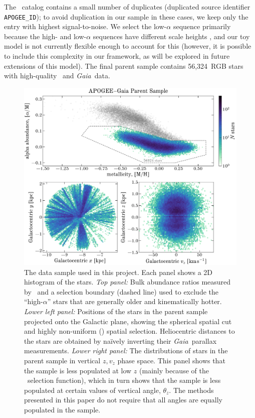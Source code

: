\documentclass[modern]{aastex63}
\newcommand{\gaia}{\textsl{Gaia}}
\newcommand{\apogee}{\acronym{APOGEE}}
\newcommand{\nstars}{56,324}
\begin{document}
The \apogee\ catalog contains a small number of duplicates (duplicated source
identifier \texttt{APOGEE\_ID}); to avoid duplication in our sample in these
cases, we keep only the entry with highest signal-to-noise.
We select the low-$\alpha$ sequence primarily because the high- and low-$\alpha$
sequences have different scale heights \citep[e.g.,][]{Bovy:2016}, and our toy
model is not currently flexible enough to account for this (however, it is
possible to include this complexity in our framework, as will be explored in
future extensions of this model).
The final parent sample contains \nstars\ RGB stars with high-quality \apogee\
and \gaia\ data.

\begin{figure}[!tp]
  \begin{mdframed}
  \color{captiongray}
  \begin{center}
  \includegraphics[width=\textwidth]{apogee-rgb-loalpha-mh-am-xy.pdf}
  \end{center}
  \caption{%
    The data sample used in this project.
    Each panel shows a 2D histogram of the stars.
    \textsl{Top panel:}
    Bulk abundance ratios measured by \apogee\ and a selection boundary (dashed
    line) used to exclude the ``high-$\alpha$'' stars that are generally older
    and kinematically hotter.
    \textsl{Lower left panel:}
    Positions of the stars in the parent sample projected onto the Galactic
    plane, showing the spherical spatial cut and highly non-uniform (\apogee)
    spatial selection.
    Heliocentric distances to the stars are obtained by na\"ively inverting
    their \gaia\ parallax measurements.
    \textsl{Lower right panel:}
    The distributions of stars in the parent sample in vertical $z, v_z$ phase
    space.
    This panel shows that the sample is less populated at low $z$ (mainly
    because of the \apogee\ selection function), which in turn shows that the
    sample is less populated at certain values of vertical angle, $\theta_z$.
    The methods presented in this paper do not require that all angles are
    equally populated in the sample.
    \label{fig:mh-am-xy}}
  \end{mdframed}
\end{figure}
\end{document}
